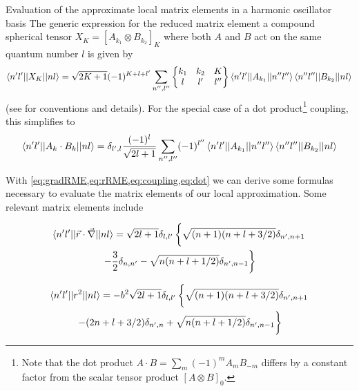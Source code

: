 \begin{section}{Evaluation of the approximate local matrix elements in a harmonic oscillator basis \label{sec:HObasis}}
The generic expression for the reduced matrix element a compound spherical tensor $X_K=\left[A_{k_1}\otimes B_{k_2}\right]_K$  where both $A$ and $B$ act on the same quantum number $l$ is given by 
\begin{equation}\label{eq:coupling}
\braket{n' l' || X_K || nl}=\sqrt{2K+1}(-1)^{K+l+l'}\sum_{n'',l''}\begin{Bmatrix} k_1 & k_2 & K \\ l & l' & l'' \end{Bmatrix}\braket{n' l' || A_{k_1} || n'' l''}\braket{n'' l'' || B_{k_2} || n l}
\end{equation}
(see \cite{Edmonds} for conventions and details). For the special case of a dot product\footnote{Note that the dot product $A\cdot B=\sum_m (-1)^m A_m B_{-m}$ differs by a constant factor from the scalar tensor product $[A\otimes B]_0$.} coupling, this simplifies to
\begin{equation}\label{eq:dot}
\braket{n' l' || A_{k}\cdot B_k || nl}=\delta_{l',l}\frac{(-1)^l}{\sqrt{2l+1}}\sum_{n'',l''}(-1)^{l''}\braket{n' l' || A_{k_1} || n'' l''}\braket{n'' l'' || B_{k_2} || n l}
\end{equation}

With \ref{eq:gradRME,eq:rRME,eq:coupling,eq:dot} we can derive some formulas necessary to evaluate the matrix elements of our local approximation. Some relevant matrix elements include

\begin{multline}
\braket{n'l' || \vec{r}\cdot\vec{\nabla} || nl } = \sqrt{2l+1}\delta_{l,l'}\left\{\sqrt{(n+1)(n+l+3/2)}\delta_{n',n+1}\vphantom{\frac{1}{2}} \right.\\
\left.-\frac{3}{2}\delta_{n,n'}-\sqrt{n(n+l+1/2)}\delta_{n',n-1}\right\}
\end{multline}

\begin{multline}
\braket{n'l' || r^2  || nl } =  -b^2 \sqrt{2l+1}\delta_{l,l'}\left\{\sqrt{(n+1)(n+l+3/2)}\delta_{n',n+1} \vphantom{\frac{1}{1}} \right.\\
\left.-(2n+l+3/2)\delta_{n',n}+\sqrt{n(n+l+1/2)}\delta_{n',n-1}\vphantom{\frac{1}{1}} \right\}
\end{multline}


\end{section}
